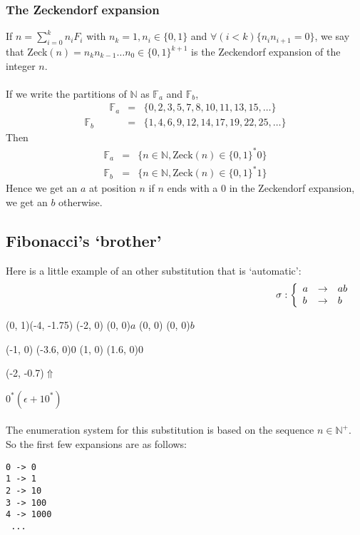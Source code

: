 \documentclass{article}
\begin{document}
\subsubsection{The Zeckendorf expansion}
If $n = \sum_{i = 0}^k n_i F_i$ with $n_k = 1, n_i \in \{0, 1\}$ and
$\forall (i < k) \{n_i n_{i + 1} = 0\}$, we say that
Zeck$(n) = n_k n_{k - 1} \ldots n_0 \in \{0, 1\}^{k + 1}$ is the Zeckendorf
expansion of the integer $n$.\\
\\
If we write the partitions of
$\mathbb{N}$ as $\mathbb{F}_a$ and $\mathbb{F}_b$,
\begin{eqnarray*}
\;\;\;\;\;\;\;\;\;
  \mathbb{F}_a &=& \{0, 2, 3, 5, 7, 8, 10, 11, 13, 15, \ldots\}\\
  \mathbb{F}_b &=& \{1, 4, 6, 9, 12, 14, 17, 19, 22, 25, \ldots\}
\end{eqnarray*}
Then
\begin{eqnarray*}
  \mathbb{F}_a &=& \{n \in \mathbb{N}, \mathrm{Zeck}(n) \in \{0, 1\}^* 0\}\\
  \mathbb{F}_b &=& \{n \in \mathbb{N}, \mathrm{Zeck}(n) \in \{0, 1\}^* 1\}
\end{eqnarray*}
Hence we get an $a$ at position $n$ if $n$ ends with a 0 in the
Zeckendorf expansion, we get an $b$ otherwise.

\subsection{Fibonacci's `brother'}
Here is a little example of an other substitution that is `automatic':\\
\begin{eqnarray*}
\;\;\;\;\;\;\;\;\;\;\;\;\;\;\;\;\;\;\;\;\;\;\;\;\;\;\;\;\; \;\;\;\;\;\;\;\;\;\;\;\;\;\;\;\;\;\;\;\;\;\;\;\;\;\;\;\;\;\;\;\;\;\;\;\;\;\;\; \;\;\;\;\;\;\;\;\;\;\;\;\;\;\;\;\;\;\;\;\;\;\;\;\;\;
\sigma: \left\{ \begin{array}{lll}
a &\rightarrow& ab\\
b &\rightarrow& b
\end{array} \right.
\end{eqnarray*}
\begin{graph}(0, 1)(-4, -1.75)
  (-2, 0) (0, 0){$a$}
  (0, 0)  (0, 0){$b$}

  (-1, 0) \freetext(-3.6, 0){0}
   
  (1, 0) \freetext(1.6, 0){0}

  \freetext(-2, -0.7){$\Uparrow$}
\end{graph} $0^* (\epsilon + 10^*)$\\
\\
The enumeration system for this substitution is based on the sequence 
$n \in \mathbb{N}^+$. So the first few expansions are as follows:
\begin{verbatim}
0 -> 0
1 -> 1
2 -> 10
3 -> 100
4 -> 1000
 ...
\end{verbatim}
\end{document}

